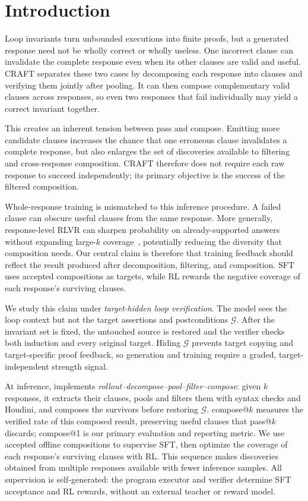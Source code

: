 \section{Introduction}\label{sec:intro}

Loop invariants turn unbounded executions into finite proofs, but a generated
response need not be wholly correct or wholly useless.  One incorrect clause
can invalidate the complete response even when its other clauses are valid and
useful.  CRAFT separates these two cases by decomposing each response into
clauses and verifying them jointly after pooling.  It can then compose
complementary valid clauses across responses, so even two responses that fail
individually may yield a correct invariant together.

This creates an inherent tension between pass and compose.  Emitting more
candidate clauses increases the chance that one erroneous clause invalidates
a complete response, but also enlarges the set of discoveries available to
filtering and cross-response composition.  CRAFT therefore does not require
each raw response to succeed independently; its primary objective is the
success of the filtered composition.

Whole-response training is mismatched to this inference procedure.  A failed
clause can obscure useful clauses from the same response.  More generally,
response-level RLVR can sharpen probability on already-supported answers
without expanding large-\(k\) coverage~\citep{yue2025rlcapacity}, potentially
reducing the diversity that composition needs.  Our central claim is therefore
that training feedback should reflect the result produced after decomposition,
filtering, and composition.  SFT uses accepted compositions as targets, while
RL rewards the negative coverage of each response's surviving clauses.

We study this claim under \emph{target-hidden loop verification}.  The model
sees the loop context but not the target assertions and postconditions \(\mathcal G\).
After the invariant set is fixed, the untouched source is restored and the
verifier checks both induction and every original target.  Hiding \(\mathcal G\)
prevents target copying and target-specific proof feedback, so generation and
training require a graded, target-independent strength signal.

At inference, \sam{} implements
\emph{rollout--decompose--pool--filter--compose}: given \(k\) responses, it
extracts their clauses, pools and filters them with syntax checks and Houdini,
and composes the survivors before restoring \(\mathcal G\).  compose@\(k\)
measures the verified rate of this composed result, preserving useful clauses
that pass@\(k\) discards; compose@1 is our primary evaluation and reporting
metric.  We use accepted offline compositions to supervise SFT, then optimize
the coverage of each response's surviving clauses with RL.  This
sequence makes discoveries obtained from multiple responses available with
fewer inference samples.  All supervision is self-generated: the program
executor and verifier determine SFT acceptance and RL rewards, without an
external teacher or reward model.

